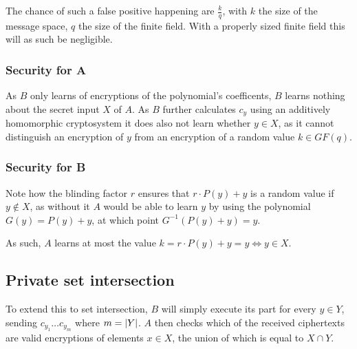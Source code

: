\documentclass[a4paper]{scrreprt}
\DeclarePairedDelimiter\abs{\lvert}{\rvert}
\begin{document}
The chance of such a false positive happening are $\frac{k}{q}$, with $k$ the
size of the message space, $q$ the size of the finite field. With a properly
sized finite field this will as such be negligible.

\subsubsection{Security for A}

As $B$ only learns of encryptions of the polynomial's coefficents, $B$ learns
nothing about the secret input $X$ of $A$. As $B$ further calculates $c_y$
using an additively homomorphic cryptosystem it does also not learn whether $y
\in X$, as it cannot distinguish an encryption of $y$ from an encryption of a
random value $k \in GF(q)$.

\subsubsection{Security for B}

Note how the blinding factor $r$ ensures that $r \cdot P(y) + y$ is a random
value if $y \not \in X$, as without it $A$ would be able to learn $y$ by using
the polynomial $G(y) = P(y) + y$, at which point $G^{-1}(P(y) + y) = y$.

As such, $A$ learns at most the value $k = r \cdot P(y) + y = y \Leftrightarrow
y \in X$.

\subsection{Private set intersection}

To extend this to set intersection, $B$ will simply execute its part for every
$y \in Y$, sending $c_{y_1} \ldots c_{y_m}$ where $m = \abs{Y}$. $A$ then
checks which of the received ciphertexts are valid encryptions of elements $x
\in X$, the union of which is equal to $X \cap Y$.
\end{document}
